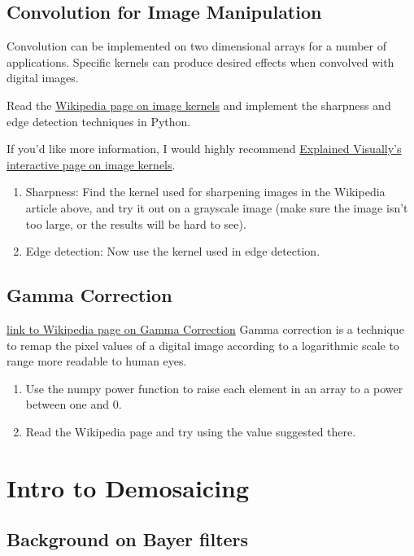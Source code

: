 \documentclass{tufte-handout}
\begin{document}
\subsection{Convolution for Image Manipulation}  %
Convolution can be implemented on two dimensional arrays for a number of applications. Specific kernels can produce desired effects when convolved with digital images.

Read the \href{https://en.wikipedia.org/wiki/Kernel_(image_processing)}{Wikipedia page on image kernels} and implement the sharpness and edge detection techniques in Python.

If you'd like more information, I would highly recommend \href{http://setosa.io/ev/image-kernels/}{Explained Visually's interactive page on image kernels}.

\begin{enumerate}[resume]
\item Sharpness:
Find the kernel used for sharpening images in the Wikipedia article above, and try it out on a grayscale image (make sure the image isn't too large, or the results will be hard to see).
\item Edge detection: Now use the kernel used in edge detection.
\end{enumerate}


\subsection{Gamma Correction}  %
\href{https://en.wikipedia.org/wiki/Gamma_correction}{link to Wikipedia page on Gamma Correction}
Gamma correction is a technique to remap the pixel values of a digital image according to a logarithmic scale to range more readable to human eyes.
\begin{enumerate}
    \item Use the numpy power function to raise each element in an array to a power between one and 0.
    \item Read the Wikipedia page and try using the value suggested there.
\end{enumerate}
\section{Intro to Demosaicing}
\subsection{Background on Bayer filters}  %
\end{document}

